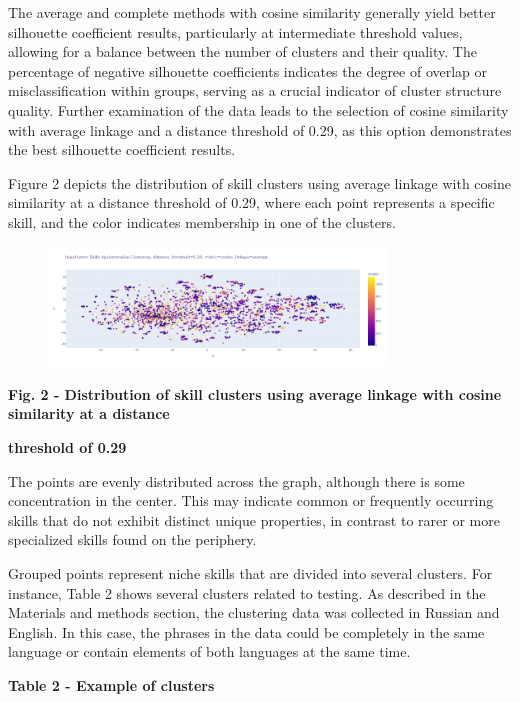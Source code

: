 The average and complete methods with cosine similarity generally yield
better silhouette coefficient results, particularly at intermediate
threshold values, allowing for a balance between the number of clusters
and their quality. The percentage of negative silhouette coefficients
indicates the degree of overlap or misclassification within groups,
serving as a crucial indicator of cluster structure quality. Further
examination of the data leads to the selection of cosine similarity with
average linkage and a distance threshold of 0.29, as this option
demonstrates the best silhouette coefficient results.

Figure 2 depicts the distribution of skill clusters using average
linkage with cosine similarity at a distance threshold of 0.29, where
each point represents a specific skill, and the color indicates
membership in one of the clusters.

\begin{figure}[H]
	\centering
	\includegraphics[width=0.8\textwidth]{media/ict/image105}
	\caption*{}
\end{figure}


{\bfseries Fig. 2 - Distribution of skill clusters using average linkage
with cosine similarity at a distance}

{\bfseries threshold of 0.29}

The points are evenly distributed across the graph, although there is
some concentration in the center. This may indicate common or frequently
occurring skills that do not exhibit distinct unique properties, in
contrast to rarer or more specialized skills found on the periphery.

Grouped points represent niche skills that are divided into several
clusters. For instance, Table 2 shows several clusters related to
testing. As described in the Materials and methods section, the
clustering data was collected in Russian and English. In this case, the
phrases in the data could be completely in the same language or contain
elements of both languages at the same time.

{\bfseries Table 2 - Example of clusters}

